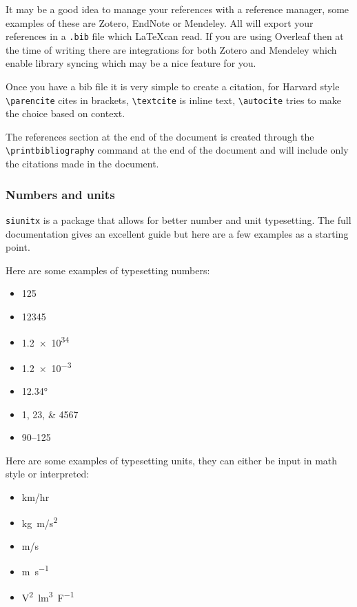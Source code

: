 It may be a good idea to manage your references with a reference manager, some examples of these are Zotero, EndNote or Mendeley. All will export your references in a \verb|.bib| file which \LaTeX can read. If you are using Overleaf then at the time of writing there are integrations for both Zotero and Mendeley which enable library syncing which may be a nice feature for you.

Once you have a bib file it is very simple to create a citation, for Harvard style \verb|\parencite| cites in brackets, \verb|\textcite| is inline text, \verb|\autocite| tries to make the choice based on context. 

The references section at the end of the document is created through the \verb|\printbibliography| command at the end of the document and will include only the citations made in the document.

\subsubsection{Numbers and units}
\verb|siunitx| is a package that allows for better number and unit typesetting. The full documentation gives an excellent guide \parencite{wright2024siunitx} but here are a few examples as a starting point.

Here are some examples of typesetting numbers:
\begin{itemize}
    \item \num{125}
    \item \num{12345}
    \item \num{1.2e34}
    \item \num{1.2e-3}
    \item \ang{12.34}
    \item \numlist{1;23;4567}
    \item \numrange{90}{125}
\end{itemize}

Here are some examples of typesetting units, they can either be input in math style or interpreted:
\begin{itemize}
    \item \unit{km/hr}
    \item \unit{kg.m/s^2}
    \item \unit{m/s}
    \item \unit{\metre \per \second}
    \item \unit{\square\volt\cubic\lumen\per\farad}
\end{itemize}

